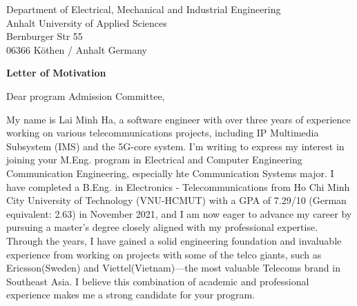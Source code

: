 \documentclass[a4paper,12pt]{letter}
\date{}
\begin{document}
\begin{letter}{
    Department of Electrical, Mechanical and Industrial Engineering
    \\ Anhalt University of Applied Sciences
    \\ Bernburger Str 55 
    \\ 06366 Köthen / Anhalt Germany
}

\vspace*{-1.5cm}
\begin{center}
    \LARGE \textbf{Letter of Motivation}
\end{center}

\vspace{0.2cm} %

\opening{Dear program Admission Committee,}

My name is Lai Minh Ha, a software engineer with over three years of experience working on various telecommunications projects, including IP Multimedia Subsystem (IMS) and the 5G-core system. I'm writing to express my interest in joining your M.Eng. program in Electrical and Computer Engineering Communication Engineering, especially hte Communication Systems major. I have completed a B.Eng. in Electronics - Telecommunications from Ho Chi Minh City University of Technology (VNU-HCMUT) with a GPA of 7.29/10 (German equivalent: 2.63) in November 2021, and I am now eager to advance my career by pursuing a master's degree closely aligned with my professional expertise. 
Through the years, I have gained a solid engineering foundation and invaluable experience from working on projects with some of the telco giants, such as Ericsson(Sweden) and Viettel(Vietnam)—the most valuable Telecoms brand in Southeast Asia. I believe this combination of academic and professional experience makes me a strong candidate for your program.

% 


\end{letter}
\end{document}
